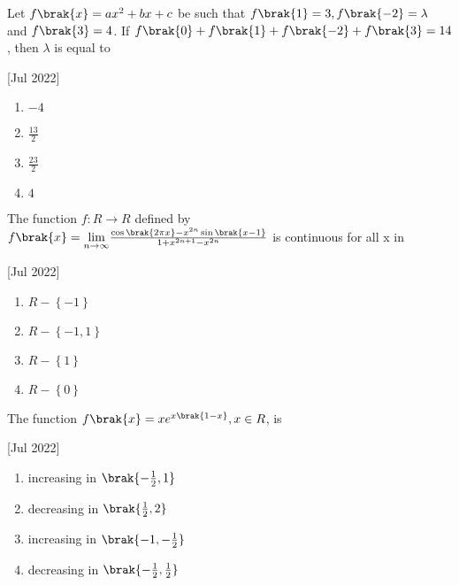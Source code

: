     \item Let $f\brak{x}=ax^2+bx+c$ be such that $f\brak{1}=3,f\brak{-2}=\lambda$ and $f\brak{3}=4$. If $f\brak{0}+f\brak{1}+f\brak{-2}+f\brak{3}=14$, then $\lambda$ is equal to 
    
    \hfill[Jul 2022]

		\begin{multicols}{4}
			\begin{enumerate}
				\item $-4$
				\item $\frac{13}{2}$
				\item $\frac{23}{2}$
				\item $4$
			\end{enumerate}
		\end{multicols}

    \item The function $f:R\to R$ defined by $f\brak{x}=\underset{n\to\infty}{\lim}\frac{\cos\brak{2\pi x}-x^{2n}\sin\brak{x-1}}{1+x^{2n+1}-x^{2n}}$ is continuous for all x in
    
    \hfill[Jul 2022]

		\begin{multicols}{4}
			\begin{enumerate}
				\item $R-\left\{-1\right\}$
				\item $R-\left\{-1,1\right\}$
				\item $R-\left\{1\right\}$
				\item $R-\left\{0\right\}$
			\end{enumerate}
		\end{multicols}
  
    \item The function $f\brak{x}=xe^{x\brak{1-x}},x\in R$, is
    
    \hfill[Jul 2022]

        \begin{multicols}{2}
            \begin{enumerate}
                \item increasing in $\brak{-\frac{1}{2},1}$
                \item decreasing in $\brak{\frac{1}{2},2}$
                \item increasing in $\brak{-1,-\frac{1}{2}}$
                \item decreasing in $\brak{-\frac{1}{2},\frac{1}{2}}$
            \end{enumerate}
        \end{multicols}


